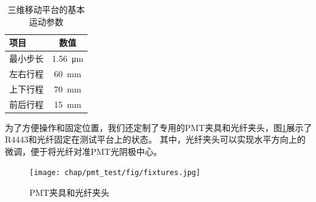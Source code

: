 \begin{table}[htb]
	\centering	
	\begin{tabulary}{0.6\linewidth}{LC}
		\toprule[1.5pt]
		\textbf{项目} & \textbf{数值}	\\ 
		\midrule[1pt]
		最小步长		& \SI{1.56}{\micro\meter}	\\
		左右行程		& \SI{60}{\milli\meter}	\\
		上下行程		& \SI{70}{\milli\meter}	\\
		前后行程		& \SI{15}{\milli\meter}	\\
		\bottomrule[1.5pt]
	\end{tabulary}
	\caption{三维移动平台的基本运动参数}
	\label{tab:pmt_test:motorized_stage}	
\end{table}
为了方便操作和固定位置，我们还定制了专用的PMT夹具和光纤夹头，图\ref{fig:pmt_test:fixtures}展示了R4443和光纤固定在测试平台上的状态。
其中，光纤夹头可以实现水平方向上的微调，便于将光纤对准PMT光阴极中心。
\begin{figure}[htbp]
	\centering
	\texttt{[image: chap/pmt\_test/fig/fixtures.jpg]}
	\caption{PMT夹具和光纤夹头}
	\label{fig:pmt_test:fixtures}
\end{figure}

